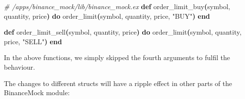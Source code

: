 \documentclass[
  oneside]{book}
\newenvironment{Shaded}{\begin{snugshade}}{\end{snugshade}}
\newcommand{\CommentTok}[1]{\textcolor[rgb]{0.56,0.35,0.01}{\textit{#1}}}
\newcommand{\FunctionTok}[1]{\textcolor[rgb]{0.13,0.29,0.53}{\textbf{#1}}}
\newcommand{\KeywordTok}[1]{\textcolor[rgb]{0.13,0.29,0.53}{\textbf{#1}}}
\newcommand{\NormalTok}[1]{#1}
\newcommand{\StringTok}[1]{\textcolor[rgb]{0.31,0.60,0.02}{#1}}
\begin{document}
\begin{Shaded}
\begin{Highlighting}[]
  \CommentTok{\# /apps/binance\_mock/lib/binance\_mock.ex}
  \KeywordTok{def}\NormalTok{ order\_limit\_buy}\FunctionTok{(}\NormalTok{symbol, quantity, price}\FunctionTok{)} \KeywordTok{do}
\NormalTok{    order\_limit}\FunctionTok{(}\NormalTok{symbol, quantity, price, }\StringTok{"BUY"}\FunctionTok{)}
  \KeywordTok{end}

  \KeywordTok{def}\NormalTok{ order\_limit\_sell}\FunctionTok{(}\NormalTok{symbol, quantity, price}\FunctionTok{)} \KeywordTok{do}
\NormalTok{    order\_limit}\FunctionTok{(}\NormalTok{symbol, quantity, price, }\StringTok{"SELL"}\FunctionTok{)}
  \KeywordTok{end}
\end{Highlighting}
\end{Shaded}

In the above functions, we simply skipped the fourth arguments to fulfil the behaviour.

The changes to different structs will have a ripple effect in other parts of the BinanceMock module:
\end{document}
